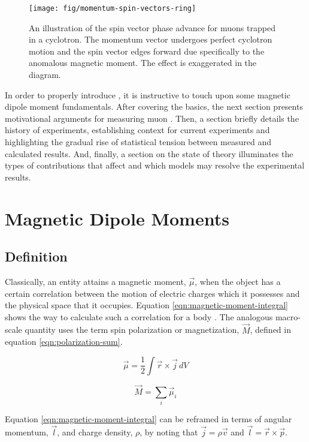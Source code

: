 \begin{figure}
\label{fig:momentum-spin-vectors-ring}
\centering
\texttt{[image: fig/momentum-spin-vectors-ring]}
\caption{An illustration of the spin vector phase advance for muons trapped in a cyclotron.  The momentum vector undergoes perfect cyclotron motion and the spin vector edges forward due specifically to the anomalous magnetic moment.  The effect is exaggerated in the diagram.}
\end{figure}

In order to properly introduce \gmtwo, it is instructive to touch upon some magnetic dipole moment fundamentals.  After covering the basics, the next section presents motivational arguments for measuring muon \gmtwo. Then, a section briefly details the history of \mugmtwo experiments, establishing context for current \mugmtwo experiments and highlighting the gradual rise of statistical tension between measured and calculated results.  And, finally, a section on the state of theory illuminates the types of contributions that affect \mugmtwo and which models may resolve the experimental results.

\section{Magnetic Dipole Moments}

\subsection{Definition}
Classically, an entity attains a magnetic moment, $\vec{\mu}$, when the object has a certain correlation between the motion of electric charges which it possesses and the physical space that it occupies.  Equation \ref{eqn:magnetic-moment-integral} shows the way to calculate such a correlation for a body \cite{jackson}.  The analogous macro-scale quantity uses the term spin polarization or magnetization, $\vec{M}$, defined in equation \ref{eqn:polarization-sum}.

\begin{equation}
\label{eqn:magnetic-moment-integral}
\vec{\mu} = \frac{1}{2} \int \vec{r} \times \vec{j} \,dV
\end{equation}

\begin{equation}
\label{eqn:polarization-sum}
\vec{M} = \sum_i \vec{\mu}_i
\end{equation}

\noindent
Equation \ref{eqn:magnetic-moment-integral} can be reframed in terms of angular momentum, $\vec{l}$, and charge density, $
\rho$, by noting that $\vec{j} = \rho \vec{v}$ and $\vec{l} = \vec{r} \times \vec{p}$.

